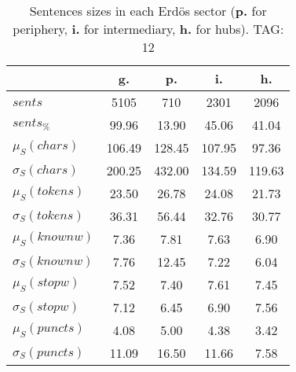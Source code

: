 \begin{table}[h!]
\begin{center}
\begin{tabular}{| l | c | c | c | c |}\hline
 & g. & p. & i. & h. \\\hline
$sents$ & 5105  & 710  & 2301  & 2096 \\\hline
$sents_{\%}$ & 99.96  & 13.90  & 45.06  & 41.04 \\\hline
$\mu_S(chars)$ & 106.49  & 128.45  & 107.95  & 97.36 \\\hline
$\sigma_S(chars)$ & 200.25  & 432.00  & 134.59  & 119.63 \\\hline
$\mu_S(tokens)$ & 23.50  & 26.78  & 24.08  & 21.73 \\\hline
$\sigma_S(tokens)$ & 36.31  & 56.44  & 32.76  & 30.77 \\\hline
$\mu_S(knownw)$ & 7.36  & 7.81  & 7.63  & 6.90 \\\hline
$\sigma_S(knownw)$ & 7.76  & 12.45  & 7.22  & 6.04 \\\hline
$\mu_S(stopw)$ & 7.52  & 7.40  & 7.61  & 7.45 \\\hline
$\sigma_S(stopw)$ & 7.12  & 6.45  & 6.90  & 7.56 \\\hline
$\mu_S(puncts)$ & 4.08  & 5.00  & 4.38  & 3.42 \\\hline
$\sigma_S(puncts)$ & 11.09  & 16.50  & 11.66  & 7.58 \\\hline
\end{tabular}
\caption{Sentences sizes in each Erd\"os sector ({{\bf p.}} for periphery, {{\bf i.}} for intermediary, {{\bf h.}} for hubs). TAG: 12}
\end{center}
\end{table}